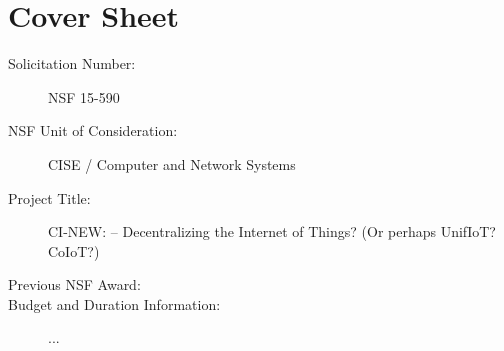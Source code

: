 
\section*{Cover Sheet}

\begin{description}
  \item[Solicitation Number:] NSF 15-590
  \item[NSF Unit of Consideration:] CISE / Computer and Network Systems
  \item[Project Title:] CI-NEW: \sysname -- Decentralizing the Internet of Things? (Or perhaps UnifIoT? CoIoT?)
  \item[Previous NSF Award:] 
  \item[Budget and Duration Information:] ...
\end{description}

\newpage

